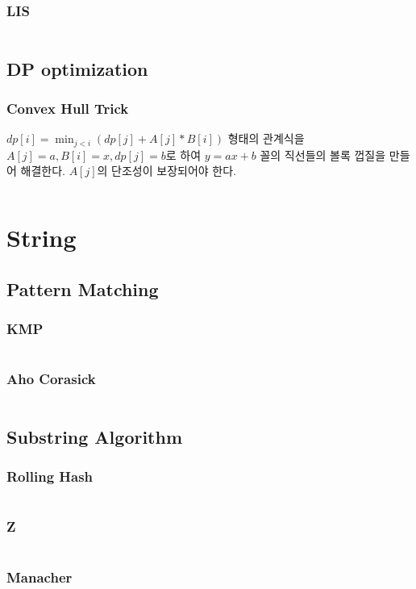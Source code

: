 \documentclass[a4paper,landscape,9pt,twocolumn]{article}
\begin{document}
\subsubsection{LIS}
\inputminted{python}{codes/dp/lis.py}
\subsection{DP optimization}
\subsubsection{Convex Hull Trick}
$dp[i] = \min_{j < i} (dp[j] + A[j]*B[i])$ 형태의 관계식을 $A[j] = a, B[i] = x, dp[j] = b$로 하여 $y = ax+b$ 꼴의 직선들의 볼록 껍질을 만들어 해결한다.
$A[j]$의 단조성이 보장되어야 한다.\\
\inputminted{python}{codes/dp/cht.py}

\section{String}
\subsection{Pattern Matching}
\subsubsection{KMP}
\inputminted{python}{codes/string/kmp.py}
\subsubsection{Aho Corasick}
\inputminted{python}{codes/string/corasick.py}
\subsection{Substring Algorithm}
\subsubsection{Rolling Hash}
\inputminted{python}{codes/string/hashing.py}
\subsubsection{Z}
\inputminted{python}{codes/string/z.py}
\subsubsection{Manacher}
\inputminted{python}{codes/string/manacher.py}
\end{document}
